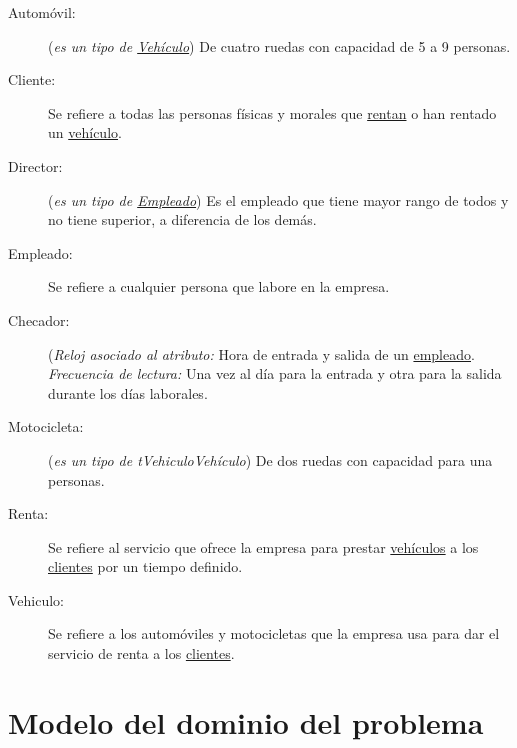 \begin{description}
	\item[\hypertarget{tAutomovil}{Automóvil:}] ({\em es un tipo de \hyperlink{tVehiculo}{Vehículo}}) De cuatro ruedas con capacidad de 5 a 9 personas. 
	\item[\hypertarget{tCliente}{Cliente:}] Se refiere a todas las personas físicas y morales que \hyperlink{tRenta}{rentan} o han rentado un \hyperlink{tVehiculo}{vehículo}.
	
	\item[\hypertarget{tDirector}{Director:}] ({\em es un tipo de \hyperlink{tEmpleado}{Empleado}}) Es el empleado que tiene mayor rango de todos y no tiene superior, a diferencia de los demás.	
	\item[\hypertarget{tEmpleado}{Empleado:}] Se refiere a cualquier persona que labore en la empresa.
	
	\item[\hypertarget{tChecador}{Checador:}] ({\em Reloj asociado al atributo:} Hora de entrada y salida de un \hyperlink{tEmpleado}{empleado}. {\em Frecuencia de lectura:} Una vez al día para la entrada y otra para la salida durante los días laborales.
	
	\item[\hypertarget{tMotocicleta}{Motocicleta:}] ({\em es un tipo de {tVehiculo}{Vehículo}}) De dos ruedas con capacidad para una personas. 

	\item[\hypertarget{tRenta}{Renta:}] Se refiere al servicio que ofrece la empresa para prestar \hyperlink{tVehiculo}{vehículos} a los \hyperlink{tCliente}{clientes} por un tiempo definido.
	
	\item[\hypertarget{tVehiculo}{Vehiculo:}] Se refiere a los automóviles y motocicletas que la empresa usa para dar el servicio de renta a los \hyperlink{tCliente}{clientes}.
	
\end{description}

\section{Modelo del dominio del problema}
\label{sec:hechosDeNegocio}


